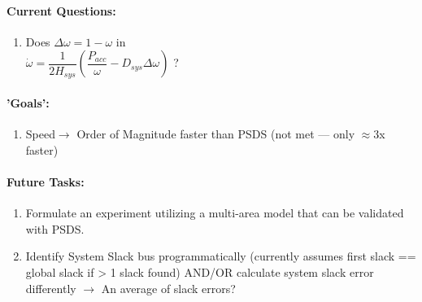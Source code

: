 \documentclass[12pt]{article}
\begin{document}
\begin{multicols}{2}
\begin{enumerate}
	\end{enumerate}

	\paragraph{Current Questions:}
	\begin{enumerate}
	\item Does $\Delta \omega=1-\omega$ in \\ $\dot{\omega}=\dfrac{1}{2H_{sys}}\left(\dfrac{P_{acc}}{\omega} - D_{sys}\Delta \omega \right)$ ?
		


		
		
	\end{enumerate}
\paragraph{'Goals':}
	\begin{enumerate}
	\item Speed$\longrightarrow$ Order of Magnitude faster than PSDS (not met --- only $\approx$3x faster)
	\end{enumerate}

\vfill\null
\columnbreak

\paragraph{Future Tasks:} %
	\begin{enumerate}
		\item Formulate an experiment utilizing a multi-area model that can be validated with PSDS.
		\item Identify System Slack bus programmatically (currently assumes first slack == global slack if > 1 slack found)
		\subitem AND/OR calculate system slack error differently $\rightarrow$ An average of slack errors?


\end{enumerate}
\end{multicols}
\end{document}
